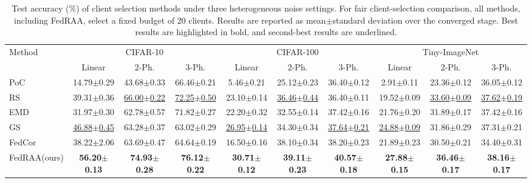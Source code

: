 \documentclass[conference]{IEEEtran}
\theoremstyle{definition}
\theoremstyle{remark}
\begin{document}
\begin{table}[!t]
\centering
\caption{Test accuracy (\%) of client selection methods under three heterogeneous noise settings. For fair client-selection comparison, all methods, including FedRAA, select a fixed budget of 20 clients. Results are reported as mean$\pm$standard deviation over the converged stage. Best results are highlighted in bold, and second-best results are underlined.}
\label{tab:selection_merged}
\setlength{\tabcolsep}{2.2pt}
\renewcommand{\arraystretch}{1.10}
\scriptsize
\begin{tabular*}{\textwidth}{@{\extracolsep{\fill}}lccccccccc@{}}
\toprule
\multirow{2}{*}{Method}
& \multicolumn{3}{c}{CIFAR-10}
& \multicolumn{3}{c}{CIFAR-100}
& \multicolumn{3}{c}{Tiny-ImageNet} \\
\cmidrule(lr){2-4}\cmidrule(lr){5-7}\cmidrule(lr){8-10}
& Linear & 2-Ph. & 3-Ph.
& Linear & 2-Ph. & 3-Ph.
& Linear & 2-Ph. & 3-Ph. \\
\midrule
PoC\cite{cho2022power}
& 14.79$\pm$0.29 & 43.68$\pm$0.33 & 66.46$\pm$0.21
& 5.46$\pm$0.21 & 25.12$\pm$0.23 & 36.40$\pm$0.12
& 2.91$\pm$0.11 & 23.36$\pm$0.12 & 36.05$\pm$0.12 \\

RS
& 39.31$\pm$0.36 & \underline{66.00$\pm$0.22} & \underline{72.25$\pm$0.50}
& 23.10$\pm$0.14 & \underline{36.46$\pm$0.44} & 36.40$\pm$0.11
& 19.52$\pm$0.09 & \underline{33.60$\pm$0.09} & \underline{37.62$\pm$0.19} \\

EMD
& 31.97$\pm$0.30 & 62.78$\pm$0.57 & 71.82$\pm$0.27
& 22.20$\pm$0.32 & 32.55$\pm$0.14 & 37.42$\pm$0.16
& 21.76$\pm$0.20 & 31.89$\pm$0.17 & 37.42$\pm$0.16 \\

GS\cite{ma2021client}
& \underline{46.88$\pm$0.45} & 63.28$\pm$0.37 & 63.02$\pm$0.29
& \underline{26.95$\pm$0.14} & 34.30$\pm$0.34 & \underline{37.64$\pm$0.21}
& \underline{24.88$\pm$0.09} & 31.86$\pm$0.29 & 37.31$\pm$0.21 \\

FedCor\cite{tang2022fedcor}
& 38.22$\pm$2.06 & 63.69$\pm$0.47 & 64.64$\pm$0.19
& 16.50$\pm$0.16 & 38.10$\pm$0.34 & 38.20$\pm$0.23
& 21.89$\pm$0.23 & 30.50$\pm$0.21 & 34.40$\pm$0.31 \\
\midrule
FedRAA(ours)
& \textbf{56.20$\pm$0.13} & \textbf{74.93$\pm$0.28} & \textbf{76.12$\pm$0.22}
& \textbf{30.71$\pm$0.12} & \textbf{39.11$\pm$0.23} & \textbf{40.57$\pm$0.18}
& \textbf{27.88$\pm$0.15} & \textbf{36.46$\pm$0.17} & \textbf{38.16$\pm$0.17} \\
\bottomrule
\end{tabular*}
\end{table}
\end{document}
